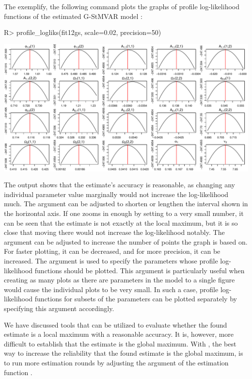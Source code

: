 \documentclass[nojss]{jss} %
\begin{document}
The exemplify, the following command plots the graphs of profile log-likelihood functions of the estimated G-StMVAR model :
%
\begin{Schunk}
\begin{Sinput}
R> profile_logliks(fit12gs, scale=0.02, precision=50)
\end{Sinput}
\end{Schunk}
\includegraphics{gmvarkit-vignette-profilelogliks}
%

The output shows that the estimate's accuracy is reasonable, as changing any individual parameter value marginally would not increase the log-likelihood much. The argument  can be adjusted to shorten or lengthen the interval shown in the horizontal axis. If one zooms in enough by setting  to a very small number, it can be seen that the estimate is not exactly at the local maximum, but it is so close that moving there would not increase the log-likelihood notably. The argument  can be adjusted to increase the number of points the graph is based on. For faster plotting, it can be decreased, and for more precision, it can be increased. The argument  is used to specify the parameters whose profile log-likelihood functions should be plotted. This argument is particularly useful when creating as many plots as there are parameters in the model to a single figure would cause the individual plots to be very small. In such a case, profile log-likelihood functions for subsets of the parameters can be plotted separately by specifying this argument accordingly.

We have discussed tools that can be utilized to evaluate whether the found estimate is a local maximum with a reasonable accuracy. It is, however, more difficult to establish that the estimate is the global maximum. With , the best way to increase the reliability that the found estimate is the global maximum, is to run more estimation rounds by adjusting the argument  of the estimation function .
\end{document}
